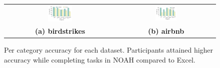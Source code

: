 \begin{figure}[!htbt]
\vspace{-7pt}
   \centering
\begin{tabular}{c c} %
   \includegraphics[width=0.23\textwidth,trim={18 20 20 20},clip]{images/bird_accC.pdf} &
   \includegraphics[width=0.23\textwidth,trim={18 20 20 20},clip]{images/airbnb_accC.pdf} \\
   \textbf{(a) birdstrikes} & \textbf{(b) airbnb} \\
\end{tabular}
\vspace{-13pt}
\caption{Per category accuracy for each dataset. Participants attained higher accuracy while completing tasks in NOAH compared to Excel.}
\vspace{-10pt}   
\label{fig:acc}
\end{figure}
